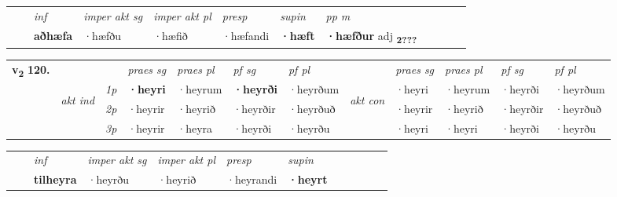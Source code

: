 \begin{tabular}{llllllllllll}
 & & \textit{inf} & \textit{imper akt sg} & \textit{imper akt pl}   & \textit{presp} & \textit{supin}  & \textit{pp m}     \\*
  & & \textbf{aðhæfa} & ·hæfðu  & ·hæfið   & ·hæfandi &  \textbf{·hæft}  & \textbf{·hæfður} adj \textbf{\textsubscript{2???}} \\*
\cmidrule{1-12}
\end{tabular}



\begin{tabular}{llllllllllll} \toprule
\multirow{4}{*}{{{\textbf{v{\textsubscript{2}}} \Large{\textbf{120.}}}}}  & &   &  \textit{praes sg}  & \textit{praes pl}  &\textit{ pf sg} & \textit{pf pl} &  &  \textit{praes sg}  & \textit{praes pl}  & \textit{pf sg} & \textit{pf pl } \\*
	\cmidrule{4-7} \cmidrule{9-12}
 & \multirow{3}{*}{\begin{turn}{90}\textit{akt ind}\end{turn}} & {\textit{1p}} & \textbf{·heyri} & ·heyrum    & \textbf{·heyrði} & ·heyrðum & \multirow{3}{*}{\begin{turn}{90}\textit{akt con}\end{turn}} &·heyri & ·heyrum & ·heyrði & ·heyrðum\\*
& &  {\textit{2p}} &  ·heyrir  & ·heyrið   & ·heyrðir & ·heyrðuð & & ·heyrir & ·heyrið & ·heyrðir & ·heyrðuð \\*
& &  {\textit{3p}} & ·heyrir & ·heyra   & ·heyrði & ·heyrðu & & ·heyri & ·heyri& ·heyrði & ·heyrðu  \\*
\cmidrule{4-7} \cmidrule{9-12}
\end{tabular}


\begin{tabular}{llllllllllll}
 & & \textit{inf} & \textit{imper akt sg} & \textit{imper akt pl}   & \textit{presp} & \textit{supin}       \\*
  & & \textbf{tilheyra} & ·heyrðu  & ·heyrið   & ·heyrandi &  \textbf{·heyrt}   \\*
\cmidrule{1-12}
\end{tabular}



